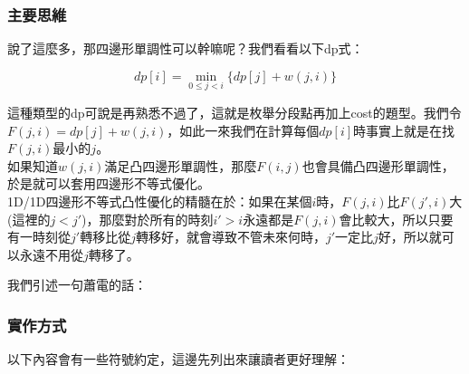 	\subsubsection{主要思維}
	
	說了這麼多，那四邊形單調性可以幹嘛呢？我們看看以下dp式：
	
	\begin{displaymath}
	dp[i] = \min\limits_{0\leq j < i} \{dp[j] + w(j, i) \}
	\end{displaymath}
	
	這種類型的dp可說是再熟悉不過了，這就是枚舉分段點再加上cost的題型。我們令$F(j, i) = dp[j] + w(j, i)$，如此一來我們在計算每個$dp[i]$時事實上就是在找$F(j, i)$最小的$j$。\\
	
	如果知道$w(j, i)$滿足凸四邊形單調性，那麼$F(i, j)$也會具備凸四邊形單調性，於是就可以套用四邊形不等式優化。\\
	
	1D/1D四邊形不等式凸性優化的精髓在於：如果在某個$i$時，$F(j, i)$比$F(j', i)$大(這裡的$j < j'$)，那麼對於所有的時刻$i' > i$永遠都是$F(j, i)$會比較大，所以只要有一時刻從$j'$轉移比從$j$轉移好，就會導致不管未來何時，$j'$一定比$j$好，所以就可以永遠不用從$j$轉移了。\\
	
	
	我們引述一句蕭電的話：\\
	
	
	\subsubsection{實作方式}
	
	以下內容會有一些符號約定，這邊先列出來讓讀者更好理解：\\
	
